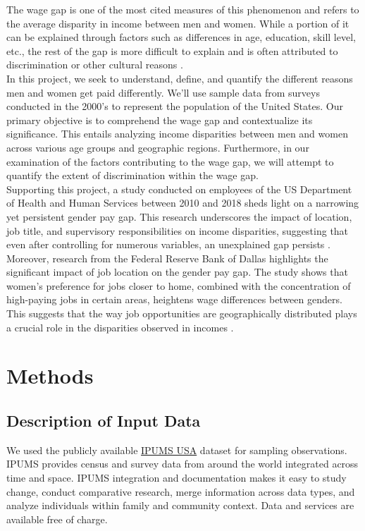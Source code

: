 \documentclass{article}
\begin{document}
The wage gap is one of the most cited measures of this phenomenon and refers to the average disparity in income between men and women. While a portion of it can be explained through factors such as differences in age, education, skill level, etc., the rest of the gap is more difficult to explain and is often attributed to discrimination or other cultural reasons \cite{issuebrief}.
\\

In this project, we seek to understand, define, and quantify the different reasons men and women get paid differently. We’ll use sample data from surveys conducted in the 2000’s to represent the population of the United States. Our primary objective is to comprehend the wage gap and contextualize its significance. This entails analyzing income disparities between men and women across various age groups and geographic regions. Furthermore, in our examination of the factors contributing to the wage gap, we will attempt to quantify the extent of discrimination within the wage gap.
\\

Supporting this project, a study conducted on employees of the US Department of Health and Human Services between 2010 and 2018 sheds light on a narrowing yet persistent gender pay gap. This research underscores the impact of location, job title, and supervisory responsibilities on income disparities, suggesting that even after controlling for numerous variables, an unexplained gap persists \cite{HRfH}. Moreover, research from the Federal Reserve Bank of Dallas highlights the significant impact of job location on the gender pay gap. The study shows that women's preference for jobs closer to home, combined with the concentration of high-paying jobs in certain areas, heightens wage differences between genders. This suggests that the way job opportunities are geographically distributed plays a crucial role in the disparities observed in incomes \cite{DallasFed}. 

\vspace{\baselineskip}
\section*{Methods}
\subsection*{Description of Input Data}
We used the publicly available \href{https://usa.ipums.org/usa/}{IPUMS USA} dataset for sampling observations.
IPUMS provides census and survey data from around the world integrated across time and space. IPUMS integration and documentation makes it easy to study change, conduct comparative research, merge information across data types, and analyze individuals within family and community context. Data and services are available free of charge.
\\
\end{document}
